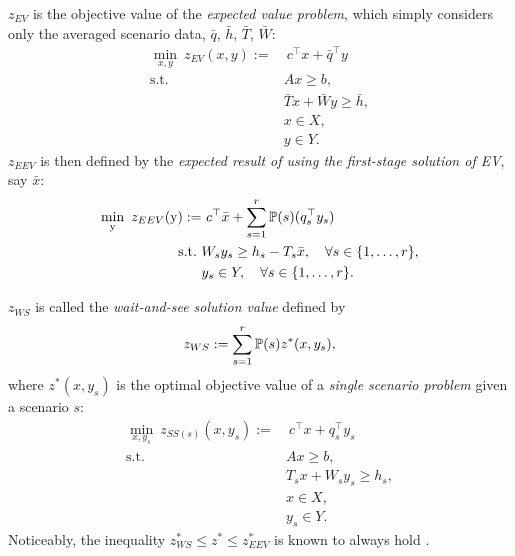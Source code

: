 $z_{EV}$ is the objective value of the \textit{expected value problem}, which simply considers only the averaged scenario data, $\bar{q}$, $\bar{h}$, $\bar{T}$, $\bar{W}$:
\begin{subequations}\label{ev}
	\begin{align}
	\min_{x,y}\ z_{EV}(x,y):=&\ c^{\top}x + \bar{q}^{\top}y \label{ev:obj}\\ 
	\mathrm{s.t.}\ &Ax\ge b,  \label{ev:b}\\
	&\bar{T} x+\bar{W} y\ge \bar{h},  \label{ev:c}\\
	&x\in X,  \label{ev:d}\\
	&y \in Y. \label{ev:e}
	\end{align}
\end{subequations}
$z_{EEV}$ is then defined by the \textit{expected result of using the first-stage solution of EV}, say $\bar{x}$: 
\begin{subequations}\label{eev}
	\begin{align}
	\min_{\mathrm{y}}\ z_{EEV}(\mathrm{y}):=&\ c^{\top}\bar{x} + \sum_{s=1}^{r}\operatorname*{\mathbb{P}}(s) (q_s^{\top}y_s) \label{eev:obj}\\ 
	\mathrm{s.t.}\ &W_s y_s\ge h_s-T_s \bar{x},\quad\forall s\in\{1,\ldots,r\}, \label{eev:b}\\
	&y_s \in Y,\quad\forall s\in\{1,\ldots,r\}. \label{eev:c}
	\end{align}
\end{subequations}

$z_{WS}$ is called the \textit{wait-and-see solution value} defined by
\begin{align} \label{ws}
	z_{WS}:=\sum_{s=1}^r \operatorname*{\mathbb{P}}(s)z^*(x,y_s),
\end{align}
where $z^*(x,y_s)$ is the optimal objective value of a \textit{single scenario problem} given a scenario $s$: 
\begin{subequations}
	\begin{align}
	\min_{x,y_s}\ z_{SS(s)}(x,y_s):=&\ c^\top x+q_s^\top y_s \label{ssp:obj}\\
	\mathrm{s.t.}\ &Ax \ge b, \label{ssp:b}\\
	&T_s x + W_s y_s\ge h_s,  \label{ssp:c}\\
	&x\in X,  \label{ssp:d}\\
	&y_s \in Y. \label{ssp:e}
	\end{align}
\end{subequations}
Noticeably, the inequality $z^*_{WS}\le z^*\le z^*_{EEV}$ is known to always hold \cite{journal:SKS2013}.

